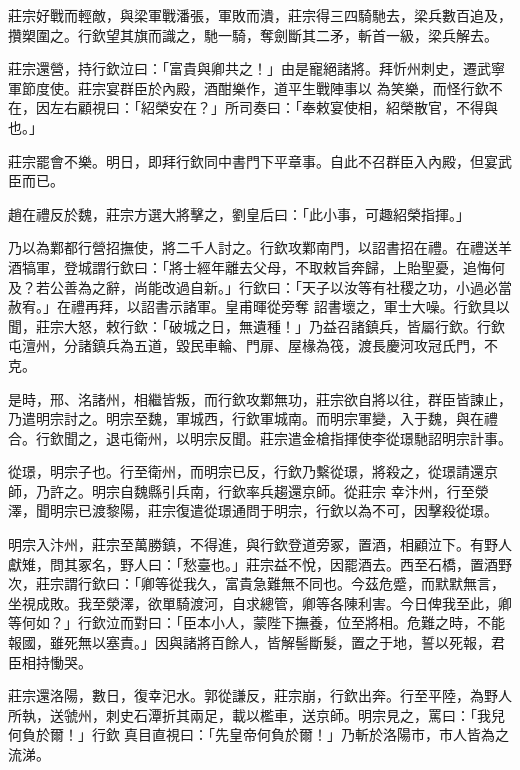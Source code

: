 \begin{pinyinscope}
 莊宗好戰而輕敵，與梁軍戰潘張，軍敗而潰，莊宗得三四騎馳去，梁兵數百追及，攢槊圍之。行欽望其旗而識之，馳一騎，奪劍斷其二矛，斬首一級，梁兵解去。



 莊宗還營，持行欽泣曰：「富貴與卿共之！」由是寵絕諸將。拜忻州刺史，遷武寧軍節度使。莊宗宴群臣於內殿，酒酣樂作，道平生戰陣事以
 為笑樂，而怪行欽不在，因左右顧視曰：「紹榮安在？」所司奏曰：「奉敕宴使相，紹榮散官，不得與也。」



 莊宗罷會不樂。明日，即拜行欽同中書門下平章事。自此不召群臣入內殿，但宴武臣而已。



 趙在禮反於魏，莊宗方選大將擊之，劉皇后曰：「此小事，可趣紹榮指揮。」



 乃以為鄴都行營招撫使，將二千人討之。行欽攻鄴南門，以詔書招在禮。在禮送羊酒犒軍，登城謂行欽曰：「將士經年離去父母，不取敕旨奔歸，上貽聖憂，追悔何及？若公善為之辭，尚能改過自新。」行欽曰：「天子以汝等有社稷之功，小過必當赦宥。」在禮再拜，以詔書示諸軍。皇甫暉從旁奪
 詔書壞之，軍士大噪。行欽具以聞，莊宗大怒，敕行欽：「破城之日，無遺種！」乃益召諸鎮兵，皆屬行欽。行欽屯澶州，分諸鎮兵為五道，毀民車輪、門扉、屋椽為筏，渡長慶河攻冠氏門，不克。



 是時，邢、洺諸州，相繼皆叛，而行欽攻鄴無功，莊宗欲自將以往，群臣皆諫止，乃遣明宗討之。明宗至魏，軍城西，行欽軍城南。而明宗軍變，入于魏，與在禮合。行欽聞之，退屯衛州，以明宗反聞。莊宗遣金槍指揮使李從璟馳詔明宗計事。



 從璟，明宗子也。行至衛州，而明宗已反，行欽乃繫從璟，將殺之，從璟請還京師，乃許之。明宗自魏縣引兵南，行欽率兵趨還京師。從莊宗
 幸汴州，行至滎澤，聞明宗已渡黎陽，莊宗復遣從璟通問于明宗，行欽以為不可，因擊殺從璟。



 明宗入汴州，莊宗至萬勝鎮，不得進，與行欽登道旁冢，置酒，相顧泣下。有野人獻雉，問其冢名，野人曰：「愁臺也。」莊宗益不悅，因罷酒去。西至石橋，置酒野次，莊宗謂行欽曰：「卿等從我久，富貴急難無不同也。今茲危蹙，而默默無言，坐視成敗。我至滎澤，欲單騎渡河，自求總管，卿等各陳利害。今日俾我至此，卿等何如？」行欽泣而對曰：「臣本小人，蒙陛下撫養，位至將相。危難之時，不能報國，雖死無以塞責。」因與諸將百餘人，皆解髻斷髮，置之于地，誓以死報，君
 臣相持慟哭。



 莊宗還洛陽，數日，復幸汜水。郭從謙反，莊宗崩，行欽出奔。行至平陸，為野人所執，送虢州，刺史石潭折其兩足，載以檻車，送京師。明宗見之，罵曰：「我兒何負於爾！」行欽真目直視曰：「先皇帝何負於爾！」乃斬於洛陽市，市人皆為之流涕。




\end{pinyinscope}
